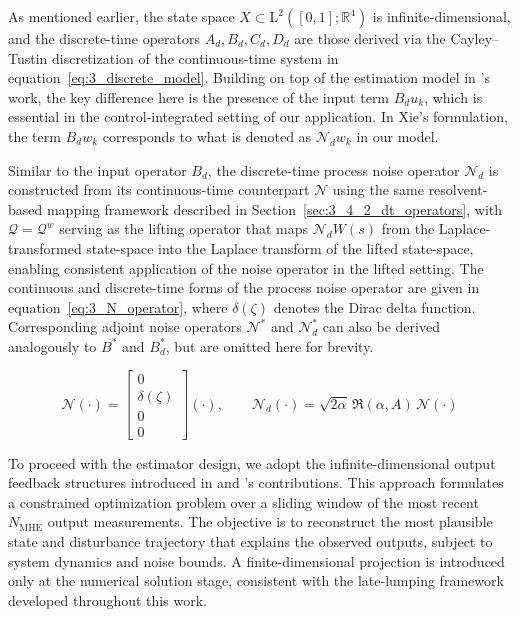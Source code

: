As mentioned earlier, the state space $X \subset \mathrm{L}^2([0,1]; \mathbb{R}^4)$ is infinite-dimensional, and the discrete-time operators $A_d, B_d, C_d, D_d$ are those derived via the Cayley--Tustin discretization of the continuous-time system in equation~\eqref{eq:3_discrete_model}. Building on top of the estimation model in 's work\autocite{xie2022constrained}, the key difference here is the presence of the input term $B_d u_k$, which is essential in the control-integrated setting of our application. In Xie's formulation, the term $B_d w_k$ corresponds to what is denoted as $\mathcal{N}_d w_k$ in our model.

Similar to the input operator $B_d$, the discrete-time process noise operator $\mathcal{N}_d$ is constructed from its continuous-time counterpart $\mathcal{N}$ using the same resolvent-based mapping framework described in Section~\ref{sec:3_4_2_dt_operators}, with $\mathcal{Q} = \mathcal{Q}^w$ serving as the lifting operator that maps $\mathcal{N}_d W(s)$ from the Laplace-transformed state-space into the Laplace transform of the lifted state-space, enabling consistent application of the noise operator in the lifted setting. The continuous and discrete-time forms of the process noise operator are given in equation~\eqref{eq:3_N_operator}, where $\delta(\zeta)$ denotes the Dirac delta function. Corresponding adjoint noise operators $\mathcal{N}^\ast$ and $\mathcal{N}_d^\ast$ can also be derived analogously to $B^\ast$ and $B_d^\ast$, but are omitted here for brevity.

\begin{equation} \label{eq:3_N_operator}
    \mathcal{N} (\cdot) = \begin{bmatrix} 0 \\ \delta(\zeta) \\ 0 \\ 0 \end{bmatrix} (\cdot), \qquad \mathcal{N}_d (\cdot) = \sqrt{2\alpha} \, \mathfrak{R}(\alpha, A) \, \mathcal{N} (\cdot)
\end{equation}

To proceed with the estimator design, we adopt the infinite-dimensional output feedback structures introduced in  and 's contributions\autocite{xie2022constrained, zhang2023tracking}. This approach formulates a constrained optimization problem over a sliding window of the most recent $N_{\mathrm{MHE}}$ output measurements. The objective is to reconstruct the most plausible state and disturbance trajectory that explains the observed outputs, subject to system dynamics and noise bounds. A finite-dimensional projection is introduced only at the numerical solution stage, consistent with the late-lumping framework developed throughout this work.

